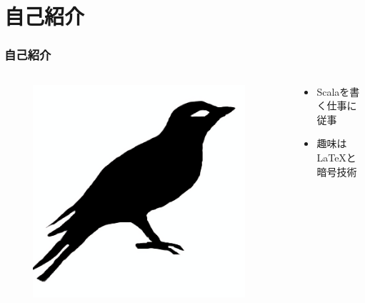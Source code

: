 



\newcommand\ballref[1]{%
\tikz \node[circle, shade,ball color=structure.fg,inner sep=0pt,%
  text width=8pt,font=\tiny,align=center] {\color{white}\ref{#1}};
}



\frame{\maketitle}

\section{自己紹介}
\begin{frame}
  \frametitle{自己紹介}
  
  \begin{columns}
    \begin{column}{0.3\textwidth}
      \centering
      \begin{figure}
        \includegraphics[width=0.95\textwidth]{img/bird2x.png}
      \end{figure}
    \end{column}
    \begin{column}{0.7\textwidth}
      \begin{itemize}
        \item<2-> Scalaを書く仕事に従事
        \item<3-> 趣味は\LaTeX と暗号技術
      \end{itemize}
    \end{column}
  \end{columns}
\end{frame}


